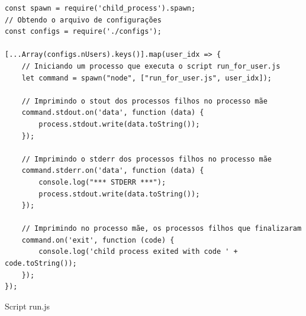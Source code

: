 \clearpage
\begin{code}
\begin{verbatim}
const spawn = require('child_process').spawn;
// Obtendo o arquivo de configurações
const configs = require('./configs');

[...Array(configs.nUsers).keys()].map(user_idx => {
    // Iniciando um processo que executa o script run_for_user.js
    let command = spawn("node", ["run_for_user.js", user_idx]);
    
    // Imprimindo o stout dos processos filhos no processo mãe
    command.stdout.on('data', function (data) {
        process.stdout.write(data.toString());
    });
    
    // Imprimindo o stderr dos processos filhos no processo mãe
    command.stderr.on('data', function (data) {
        console.log("*** STDERR ***");
        process.stdout.write(data.toString());
    });
    
    // Imprimindo no processo mãe, os processos filhos que finalizaram
    command.on('exit', function (code) {
        console.log('child process exited with code ' + code.toString());
    });
});
\end{verbatim}
\caption{Script run.js}
\label{lst:run_script}
\end{code}


